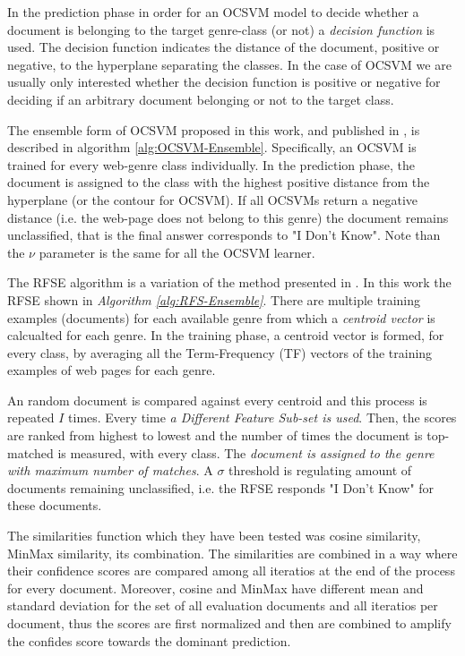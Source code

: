 In the prediction phase in order for an OCSVM model to decide whether a document is belonging to the target genre-class (or not) a \textit{decision function} is used. The decision function indicates the distance of the document, positive or negative, to the hyperplane separating the classes. In the case of OCSVM we are usually only interested whether the decision function is positive or negative for deciding if an arbitrary document belonging or not to the target class.

The ensemble form of  OCSVM proposed in this work, and published in , is described in algorithm \ref{alg:OCSVM-Ensemble}. Specifically, an OCSVM is trained for every web-genre class individually. In the prediction phase, the document is assigned to the class with the highest positive distance from the hyperplane (or the contour for OCSVM). If all OCSVMs return a negative distance (i.e. the web-page does not belong to this genre) the document remains unclassified, that is the final answer corresponds to "I Don't Know". Note than the $\nu$ parameter is the same for all the OCSVM learner. 

The RFSE algorithm is a variation of the method presented in . In this work the RFSE shown in \textit{Algorithm \ref{alg:RFS-Ensemble}}. There are multiple training examples (documents) for each available genre from which a \textit{centroid vector} is calcualted for each genre. In the training phase, a centroid vector is formed, for every class, by averaging all the Term-Frequency (TF) vectors of the training examples of web pages for each genre.

An random document is compared against every centroid and this process is repeated $I$ times. Every time \textit{a Different Feature Sub-set is used}. Then, the scores are ranked from highest to lowest and the number of times the document is top-matched is measured, with every class. The \textit{document is assigned to the genre with maximum number of matches}. A $\sigma$ threshold is regulating amount of documents remaining unclassified, i.e. the RFSE responds "I Don't Know" for these documents.

The similarities function which they have been tested was cosine similarity, MinMax similarity, its combination. The similarities are combined in a way where their confidence scores are compared among all iteratios at the end of the process for every document. Moreover, cosine and MinMax have different mean and standard deviation for the set of all evaluation documents and all iteratios per document, thus the scores are first normalized and then are combined to amplify the confides score towards the dominant prediction.

